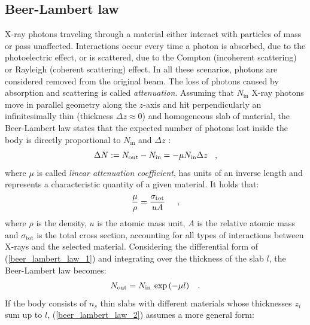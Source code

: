 {\subsection{Beer-Lambert law}
\label{introduction:beer-lambert-law}
X-ray photons traveling through a material either interact with particles of mass or pass unaffected. Interactions occur every time
a photon is absorbed, due to the photoelectric effect, or is scattered, due to the Compton (incoherent scattering) or 
Rayleigh (coherent scattering) effect. 
In all these scenarios, photons are considered removed from the original beam.  The loss of photons caused by absorption and scattering is called \emph{attenuation}.
\newline
Assuming that $N_{\text{in}}$ X-ray photons move in parallel geometry along the $z$-axis and
hit perpendicularly an infinitesimally thin (thickness $\Delta z \approx 0$) and homogeneous slab of material, 
the Beer-Lambert law states that the expected number of photons lost inside the body is directly proportional to $N_{\text{in}}$ and $\Delta z$
\cite{Bouger1729,Lambert1760,Beer1852}:
\begin{equation}
  \Delta N := N_{\text{out}} - N_{\text{in}} = -\mu N_{\text{in}}\Delta z \hspace{0.3cm},
  \label{beer_lambert_law_1}
\end{equation}
where $\mu$ is called \emph{linear attenuation coefficient}, has units of an inverse length and represents 
a characteristic quantity of a given material. It holds that:
\begin{equation}
  \frac{\mu}{\rho} = \frac{\sigma_{\text{tot}}}{uA} \hspace{0.5cm},
\end{equation}
where $\rho$ is the density, $u$ is the atomic mass unit, $A$ is the relative atomic mass and $\sigma_{\text{tot}}$
is the total cross section, accounting for all types of interactions between X-rays and the selected material.
Considering the differential form 
of (\ref{beer_lambert_law_1}) and integrating over the thickness of the slab $l$, the Beer-Lambert law becomes:
\begin{equation}
  N_{\text{out}} = N_{\text{in}}\:\exp\left(-\mu l\right) \hspace{0.3cm}.
   \label{beer_lambert_law_2} 
\end{equation}
If the body consists of $n_{s}$ thin slabs with different materials whose thicknesses $z_{i}$
sum up to $l$, (\ref{beer_lambert_law_2}) assumes a more general form:
\begin{equation}

\end{equation}}
